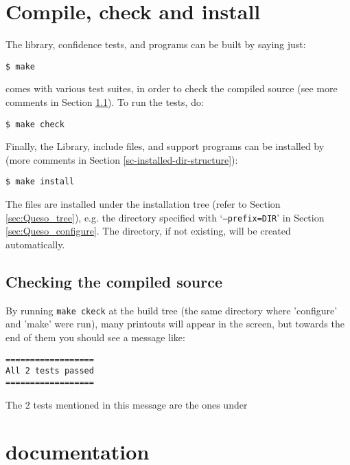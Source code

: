 \section{Compile, check and install \Queso{}}
%
The library, confidence tests, and programs can be built by saying just:
\begin{verbatim}
$ make
\end{verbatim}

\Queso{} comes with various test suites, in order to check the compiled source (see more comments in Section \ref{sc-checks}). To run the tests, do:
\begin{verbatim}
$ make check
\end{verbatim}

Finally, the \Queso{} Library, include files, and support programs can be installed by (more comments in Section \ref{sc-installed-dir-structure}):
\begin{verbatim}
$ make install 
\end{verbatim}

The files are installed under the installation tree (refer to Section \ref{sec:Queso_tree}), e.g. the directory specified with `\texttt{--prefix=DIR}' in Section \ref{sec:Queso_configure}. The directory, if not existing, will be created automatically.%


\subsection{Checking the compiled source} \label{sc-checks}

By running \texttt{make ckeck} at the build tree (the same directory where 'configure' and 'make' were run), many printouts will appear in the screen, but towards the end of them you should see
a message like:
\begin{verbatim}
==================
All 2 tests passed
==================
\end{verbatim}

The 2 tests mentioned in this message are the ones under 


\section{\Queso{} documentation}\label{sec:Queso_docs}

